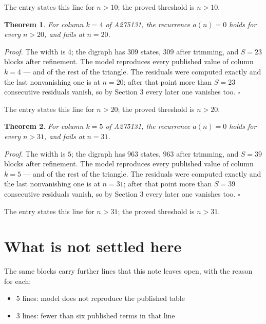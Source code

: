\documentclass[11pt]{article}
\newtheorem{theorem}{Theorem}
\theoremstyle{definition}
\begin{document}
The entry states this line for $n > 10$; the proved threshold is $n > 10$.

\begin{theorem} For column $k = 4$ of A275131, the recurrence $a(n) = 0$ holds for every $n > 20$, and fails at $n = 20$.\end{theorem}

{\itshape Proof.} The width is $4$; the digraph has $309$ states, $309$ after trimming, and $S = 23$ blocks after refinement. The model reproduces every published value of column $k = 4$ --- and of the rest of the triangle. The residuals were computed exactly and the last nonvanishing one is at $n = 20$; after that point more than $S = 23$ consecutive residuals vanish, so by Section 3 every later one vanishes too. $\square$

The entry states this line for $n > 20$; the proved threshold is $n > 20$.

\begin{theorem} For column $k = 5$ of A275131, the recurrence $a(n) = 0$ holds for every $n > 31$, and fails at $n = 31$.\end{theorem}

{\itshape Proof.} The width is $5$; the digraph has $963$ states, $963$ after trimming, and $S = 39$ blocks after refinement. The model reproduces every published value of column $k = 5$ --- and of the rest of the triangle. The residuals were computed exactly and the last nonvanishing one is at $n = 31$; after that point more than $S = 39$ consecutive residuals vanish, so by Section 3 every later one vanishes too. $\square$

The entry states this line for $n > 31$; the proved threshold is $n > 31$.

\section{What is not settled here}

The same blocks carry further lines that this note leaves open, with the reason for each:

\begin{itemize}

\item 5 lines: model does not reproduce the published table

\item 3 lines: fewer than six published terms in that line

\end{itemize}
\end{document}
